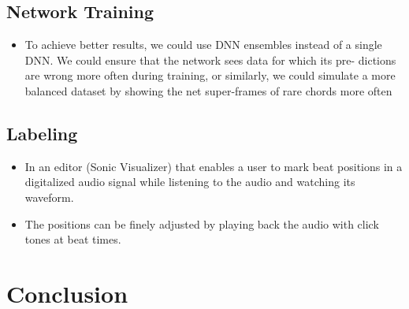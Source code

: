 \documentclass{scrartcl}
\begin{document}
\subsection{Network Training}

\begin{itemize}
\item To achieve better results, we could use DNN ensembles instead of a single DNN. We could ensure that the network sees data for which its pre- dictions are wrong more often during training, or similarly, we could simulate a more balanced dataset by showing the net super-frames of rare chords more often \cite{Korzeniowski2016}
\end{itemize}



\subsection{Labeling}

\begin{itemize}
\item In an editor (Sonic Visualizer) that enables a user to mark beat positions in a digitalized audio signal while listening to the audio and watching its waveform.
\item The positions can be finely adjusted by playing back the audio with click tones at beat times.
\end{itemize}


\section{Conclusion}
\end{document}
